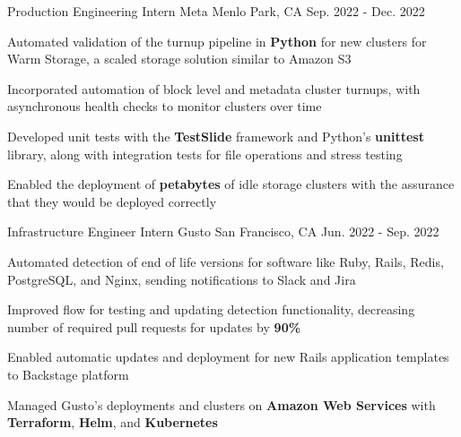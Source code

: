 

\begin{cventries}

\cventry
{Production Engineering Intern} %
{Meta} %
{Menlo Park, CA} %
{Sep. 2022 - Dec. 2022} %
{
  \begin{cvitems} %
    \item {Automated validation of the turnup pipeline in \textbf{Python} for new clusters for Warm Storage, a scaled storage solution similar to Amazon S3}
    \item {Incorporated automation of block level and metadata cluster turnups, with asynchronous health checks to monitor clusters over time}
    \item {Developed unit tests with the \textbf{TestSlide} framework and Python's \textbf{unittest} library, along with integration tests for file operations and stress testing}
    \item {Enabled the deployment of \textbf{petabytes} of idle storage clusters with the assurance that they would be deployed correctly}
  \end{cvitems}
}

\cventry
{Infrastructure Engineer Intern} %
{Gusto} %
{San Francisco, CA} %
{Jun. 2022 - Sep. 2022} %
{
  \begin{cvitems} %
    \item {Automated detection of end of life versions for software like Ruby, Rails, Redis, PostgreSQL, and Nginx, sending notifications to Slack and Jira}
    \item {Improved flow for testing and updating detection functionality, decreasing number of required pull requests for updates by \textbf{90\%}}
    \item {Enabled automatic updates and deployment for new Rails application templates to Backstage platform}
    \item {Managed Gusto's deployments and clusters on \textbf{Amazon Web Services} with \textbf{Terraform}, \textbf{Helm}, and \textbf{Kubernetes}}
  \end{cvitems}
}


\end{cventries}
